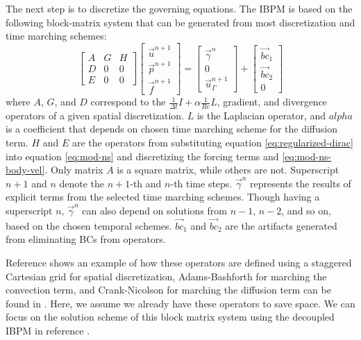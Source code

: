 The next step is to discretize the governing equations.
The IBPM is based on the following block-matrix system that can be generated from most discretization and time marching schemes:
\begin{equation}\label{eq:block-sys-ns}
    \begin{bmatrix}
        A & G & H \\
        D & 0 & 0 \\
        E & 0 & 0
    \end{bmatrix}
    \begin{bmatrix}
        \vec{u}^{n+1} \\
        \vec{p}^{n+1} \\
        \vec{f}^{n+1}
    \end{bmatrix}
    =
    \begin{bmatrix}
        \vec{\gamma}^n \\
        0 \\
        \vec{u}_\Gamma^{n+1}
    \end{bmatrix}
    +
    \begin{bmatrix}
        \vec{bc}_1 \\
        \vec{bc}_2 \\
        0
    \end{bmatrix}
\end{equation}
where $A$, $G$, and $D$ correspond to the $\frac{1}{\Delta t}I+\alpha\frac{1}{Re}L$, gradient, and divergence operators of a given spatial discretization. 
$L$ is the Laplacian operator, and $alpha$ is a coefficient that depends on chosen time marching scheme for the diffusion term.
$H$ and $E$ are the operators from substituting equation \eqref{eq:regularized-dirac} into equation \eqref{eq:mod-ns} and discretizing the forcing terms and \eqref{eq:mod-ns-body-vel}.
Only matrix $A$ is a square matrix, while others are not.
Superscript $n+1$ and $n$ denote the $n+1$-th and $n$-th time steps.
$\vec{\gamma}^n$ represents the results of explicit terms from the selected time marching schemes.
Though having a superscript $n$, $\vec{\gamma}^n$ can also depend on solutions from $n-1$, $n-2$, and so on, based on the chosen temporal schemes.
$\vec{bc}_1$ and $\vec{bc}_2$ are the artifacts generated from eliminating BCs from operators.

Reference \cite{taira_immersed_2007} shows an example of how these operators are defined using a staggered Cartesian grid for spatial discretization, Adams-Bashforth for marching the convection term, and Crank-Nicolson for marching the diffusion term can be found in \cite{taira_immersed_2007}.
Here, we assume we already have these operators to save space.
We can focus on the solution scheme of this block matrix system using the decoupled IBPM in reference \cite{li_efficient_2016}.

